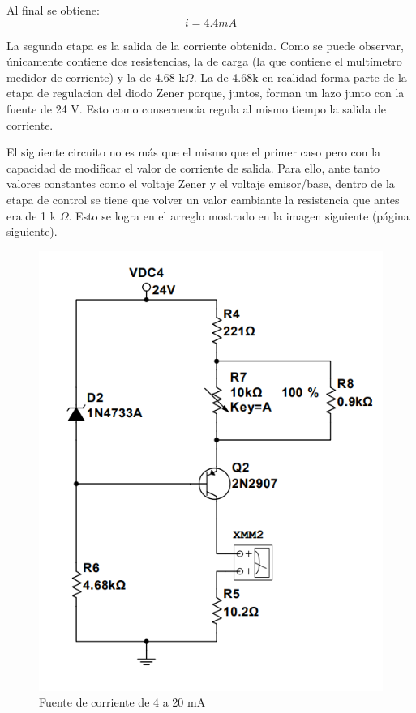 \documentclass{article}
\begin{document}
Al final se obtiene:
\[ i = 4.4 mA \]

La segunda etapa es la salida de la corriente obtenida. Como se puede observar, únicamente contiene dos resistencias, la de
carga (la que contiene el multímetro medidor de corriente) y la de 4.68 k\(\Omega\). La de 4.68k en realidad forma parte de
la etapa de regulacion del diodo Zener porque, juntos, forman un lazo junto con la fuente de 24 V. Esto como consecuencia regula
al mismo tiempo la salida de corriente.

El siguiente circuito no es más que el mismo que el primer caso pero con la capacidad de modificar el valor de corriente de salida.
Para ello, ante tanto valores constantes como el voltaje Zener y el voltaje emisor/base, dentro de la etapa de control se tiene
que volver un valor cambiante la resistencia que antes era de 1 k \(\Omega\). Esto se logra en el arreglo mostrado en la imagen 
siguiente (página siguiente).

\begin{figure}[htb]
    \centering
    \includegraphics[scale=0.6]{casoB.png}
    \caption{Fuente de corriente de 4 a 20 mA}
    \label{Fig: Fuente de corriente de 4 a 20 mA}
\end{figure}
\end{document}
